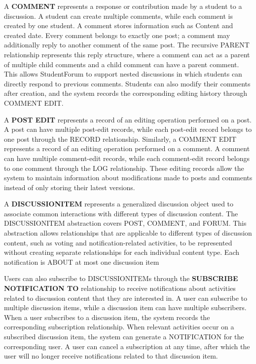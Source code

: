 A \textbf{COMMENT} represents a response or contribution made by a student to a discussion. A student can create multiple comments, while each comment is created by one student. A comment stores information such as Content and created date. Every comment belongs to exactly one post; a comment may additionally reply to another comment of the same post. The recursive PARENT relationship represents this reply structure, where a comment can act as a parent of multiple child comments and a child comment can have a parent comment. This allows StudentForum to support nested discussions in which students can directly respond to previous comments. Students can also modify their comments after creation, and the system records the corresponding editing history through COMMENT EDIT.

A \textbf{POST EDIT} represents a record of an editing operation performed on a post. A post can have multiple post-edit records, while each post-edit record belongs to one post through the RECORD relationship. Similarly, a COMMENT EDIT represents a record of an editing operation performed on a comment. A comment can have multiple comment-edit records, while each comment-edit record belongs to one comment through the LOG relationship. These editing records allow the system to maintain information about modifications made to posts and comments instead of only storing their latest versions.

A \textbf{DISCUSSIONITEM} represents a generalized discussion object used to associate common interactions with different types of discussion content. The DISCUSSIONITEM abstraction covers POST, COMMENT, and FORUM. This abstraction allows relationships that are applicable to different types of discussion content, such as voting and notification-related activities, to be represented without creating separate relationships for each individual content type. Each notification is ABOUT at most one discussion item

Users can also subscribe to DISCUSSIONITEMs through the \textbf{SUBSCRIBE NOTIFICATION TO} relationship to receive notifications about activities related to discussion content that they are interested in. A user can subscribe to multiple discussion items, while a discussion item can have multiple subscribers. When a user subscribes to a discussion item, the system records the corresponding subscription relationship. When relevant activities occur on a subscribed discussion item, the system can generate a NOTIFICATION for the corresponding user. A user can cancel a subscription at any time, after which the user will no longer receive notifications related to that discussion item.

